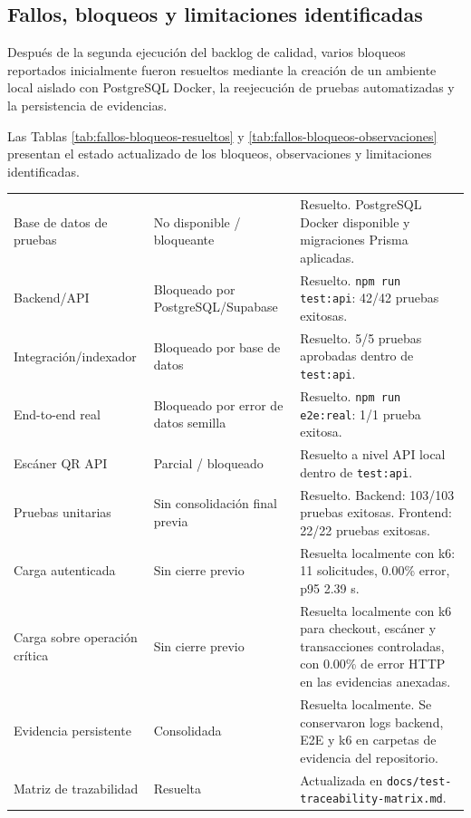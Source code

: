 \documentclass[12pt,letterpaper]{article}
\begin{document}
\subsection{Fallos, bloqueos y limitaciones identificadas}

Después de la segunda ejecución del backlog de calidad, varios bloqueos reportados inicialmente fueron resueltos mediante la creación de un ambiente local aislado con PostgreSQL Docker, la reejecución de pruebas automatizadas y la persistencia de evidencias.

Las Tablas \ref{tab:fallos-bloqueos-resueltos} y \ref{tab:fallos-bloqueos-observaciones} presentan el estado actualizado de los bloqueos, observaciones y limitaciones identificadas.

\begin{table}[H]
\centering
\begingroup
\scriptsize
\setlength{\tabcolsep}{3pt}
\renewcommand{\arraystretch}{1.18}

\begin{tabularx}{\textwidth}{|
>{\raggedright\arraybackslash}p{3.6cm}|
>{\raggedright\arraybackslash}p{3.7cm}|
>{\raggedright\arraybackslash}X|}
\hline
\multicolumn{1}{|>{\centering\arraybackslash}m{3.6cm}|}{\textbf{Elemento}} &
\multicolumn{1}{>{\centering\arraybackslash}m{3.7cm}|}{\textbf{Estado anterior}} &
\multicolumn{1}{>{\centering\arraybackslash}m{7.0cm}|}{\textbf{Estado actualizado}} \\
\hline
Base de datos de pruebas & No disponible / bloqueante & Resuelto. PostgreSQL Docker disponible y migraciones Prisma aplicadas. \\
\hline
Backend/API & Bloqueado por PostgreSQL/Supabase & Resuelto. \texttt{npm run test:api}: 42/42 pruebas exitosas. \\
\hline
Integración/indexador & Bloqueado por base de datos & Resuelto. 5/5 pruebas aprobadas dentro de \texttt{test:api}. \\
\hline
End-to-end real & Bloqueado por error de datos semilla & Resuelto. \texttt{npm run e2e:real}: 1/1 prueba exitosa. \\
\hline
Escáner QR API & Parcial / bloqueado & Resuelto a nivel API local dentro de \texttt{test:api}. \\
\hline
Pruebas unitarias & Sin consolidación final previa & Resuelto. Backend: 103/103 pruebas exitosas. Frontend: 22/22 pruebas exitosas. \\
\hline
Carga autenticada & Sin cierre previo & Resuelta localmente con k6: 11 solicitudes, 0.00\% error, p95 2.39 s. \\
\hline
Carga sobre operación crítica & Sin cierre previo & Resuelta localmente con k6 para checkout, escáner y transacciones controladas, con 0.00\% de error HTTP en las evidencias anexadas. \\
\hline
Evidencia persistente & Consolidada & Resuelta localmente. Se conservaron logs backend, E2E y k6 en carpetas de evidencia del repositorio. \\
\hline
Matriz de trazabilidad & Resuelta & Actualizada en \texttt{docs/test-traceability-matrix.md}. \\
\hline
\end{tabularx}


\end{table}
\end{document}
